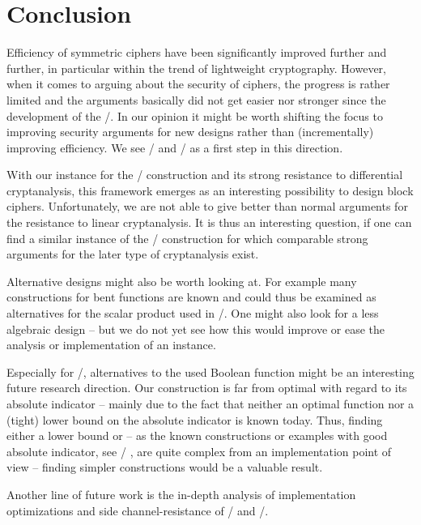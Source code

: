 \section{Conclusion}
Efficiency of symmetric ciphers have been significantly improved further and further, in particular within the trend of lightweight cryptography.
However, when it comes to arguing about the security of ciphers, the progress is rather limited and the arguments basically did not get easier nor stronger since the development of the \AES/.
In our opinion it might be worth shifting the focus to improving security arguments for new designs rather than (incrementally) improving efficiency.
We see \bison/ and \wisent/ as a first step in this direction.

With our instance for the \WSN/ construction and its strong resistance to differential cryptanalysis, this framework emerges as an interesting possibility to design block ciphers.
Unfortunately, we are not able to give better than normal arguments for the resistance to linear cryptanalysis.
It is thus an interesting question, if one can find a similar instance of the \WSN/ construction for which comparable strong arguments for the later type of cryptanalysis exist.

Alternative designs might also be worth looking at.
For example many constructions for bent functions are known and could thus be examined as alternatives for the scalar product used in \bison/.
One might also look for a less algebraic design -- but we do not yet see how this would improve or ease the analysis or implementation of an instance.

Especially for \wisent/, alternatives to the used Boolean function might be an interesting future research direction.
Our construction is far from optimal with regard to its absolute indicator -- mainly due to the fact that neither an optimal function nor a (tight) lower bound on the absolute indicator is known today.
Thus, finding either a lower bound or -- as the known constructions or examples with good absolute indicator, see \eg/ , are quite complex from an implementation point of view -- finding simpler constructions would be a valuable result.

Another line of future work is the in-depth analysis of implementation optimizations and side channel-resistance of \bison/ and \wisent/.
